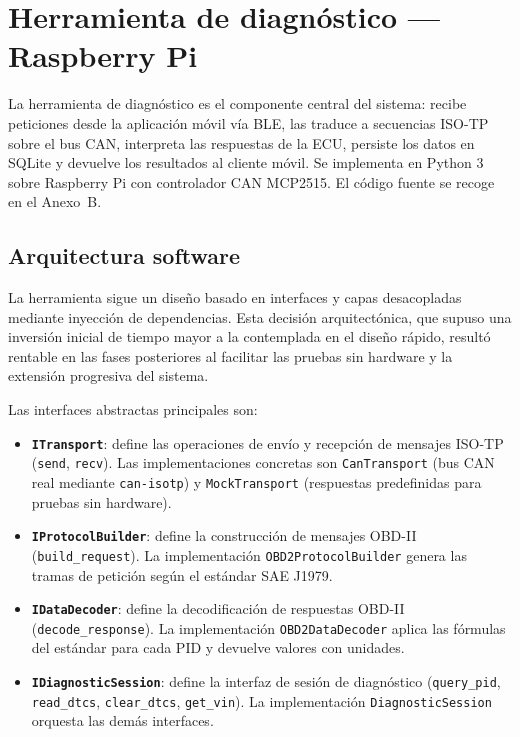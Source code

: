 \section{Herramienta de diagnóstico — Raspberry Pi}
\label{sec:raspberry}

La herramienta de diagnóstico es el componente central del sistema: recibe peticiones desde la aplicación móvil vía BLE, las traduce a secuencias ISO-TP sobre el bus CAN, interpreta las respuestas de la ECU, persiste los datos en SQLite y devuelve los resultados al cliente móvil. Se implementa en Python 3 sobre Raspberry Pi con controlador CAN MCP2515. El código fuente se recoge en el Anexo~B.


\subsection{Arquitectura software}
\label{sec:python_arch}

La herramienta sigue un diseño basado en interfaces y capas desacopladas mediante inyección de dependencias. Esta decisión arquitectónica, que supuso una inversión inicial de tiempo mayor a la contemplada en el diseño rápido, resultó rentable en las fases posteriores al facilitar las pruebas sin hardware y la extensión progresiva del sistema.

Las interfaces abstractas principales son:

\begin{itemize}
    \item \textbf{\texttt{ITransport}}: define las operaciones de envío y recepción de mensajes ISO-TP (\texttt{send}, \texttt{recv}). Las implementaciones concretas son \texttt{CanTransport} (bus CAN real mediante \texttt{can-isotp}) y \texttt{MockTransport} (respuestas predefinidas para pruebas sin hardware).

    \item \textbf{\texttt{IProtocolBuilder}}: define la construcción de mensajes OBD-II (\texttt{build\_request}). La implementación \texttt{OBD2ProtocolBuilder} genera las tramas de petición según el estándar SAE J1979.

    \item \textbf{\texttt{IDataDecoder}}: define la decodificación de respuestas OBD-II (\texttt{decode\_response}). La implementación \texttt{OBD2DataDecoder} aplica las fórmulas del estándar para cada PID y devuelve valores con unidades.

    \item \textbf{\texttt{IDiagnosticSession}}: define la interfaz de sesión de diagnóstico (\texttt{query\_pid}, \texttt{read\_dtcs}, \texttt{clear\_dtcs}, \texttt{get\_vin}). La implementación \texttt{DiagnosticSession} orquesta las demás interfaces.
\end{itemize}

